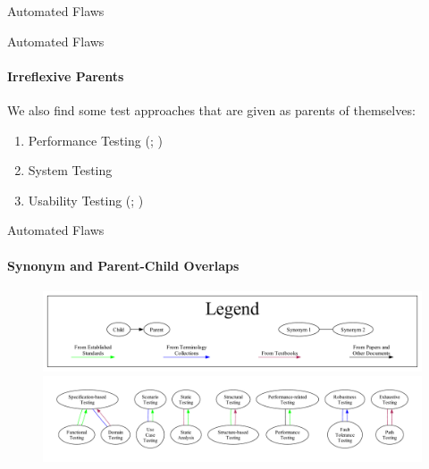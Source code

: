 \begin{frame}{Automated Flaws}
\begin{enumerate}
    \end{enumerate}
\end{frame}

\begin{frame}{Automated Flaws}
    \framesubtitle{Irreflexive Parents}
    We also find some test approaches that are given as parents of themselves:
    \vspace{0.25cm}
    \begin{enumerate}
        \item Performance Testing {\tiny (\citealp[Tab.~2]{Gerrard2000a}; \citeyear[Tab.~1]{Gerrard2000b})}
        \item System Testing {\tiny \citep[p.~23]{Firesmith2015}}
        \item Usability Testing {\tiny (\citealp[Tab.~2]{Gerrard2000a}; \citeyear[Tab.~1]{Gerrard2000b})}
    \end{enumerate}
\end{frame}

\begin{frame}{Automated Flaws}
    \framesubtitle{Synonym and Parent-Child Overlaps}
    \begin{figure}[h!]
        \centering
        \includegraphics[width=\linewidth]{assets/graphs/manual/expParSynLegend.pdf}
        \includegraphics[width=\linewidth]{assets/graphs/manual/expParSynGraph.pdf}
    \end{figure}
\end{frame}

